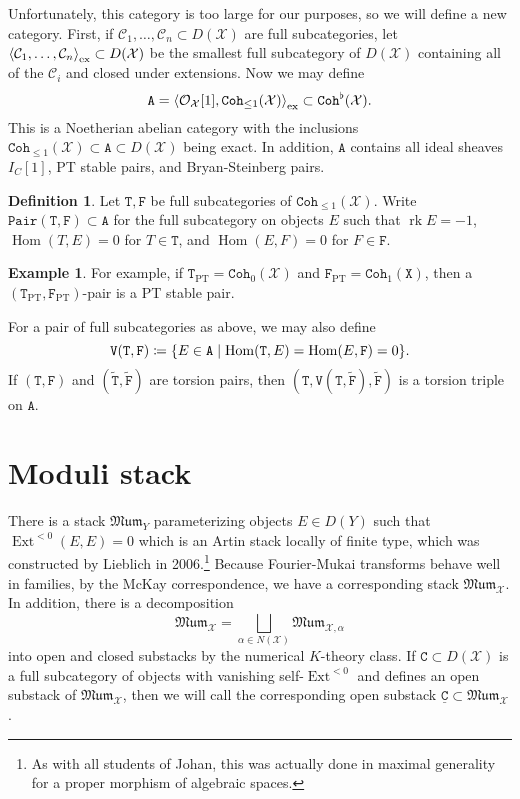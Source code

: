\documentclass{amsart}
\theoremstyle{definition}
\newtheorem{defn}[thm]{Definition}
\newtheorem{exm}[thm]{Example}
\theoremstyle{remark}
\theoremstyle{plain}
\theoremstyle{definition}
\theoremstyle{remark}
\newcommand{\mc}[1]{\mathcal{#1}}
\newcommand{\mf}[1]{\mathfrak{#1}}
\newcommand{\mr}[1]{\mathrm{#1}}
\newcommand{\on}[1]{\operatorname{#1}}
\newcommand{\mt}[1]{\mathtt{#1}}
\newcommand{\ul}[1]{\underline{#1}}
\newcommand{\wt}[1]{\widetilde{#1}}
\newcommand{\1}{\mathbf{1}}
\newcommand{\2}{\mathbf{2}}
\newcommand{\3}{\mathbf{3}}
\DeclareMathOperator{\Hom}{Hom}
\DeclareMathOperator{\Ext}{Ext}
\begin{document}
Unfortunately, this category is too large for our purposes, so we will define a new category. First, if $\mc{C}_1, \ldots, \mc{C}_n \subset D(\mc{X})$ are full subcategories, let $\ev{\mc{C}_1, \ldots, \mc{C}_n}_{\mr{ex}} \subset D(\mc{X})$ be the smallest full subcategory of $D(\mc{X})$ containing all of the $\mc{C}_i$ and closed under extensions. Now we may define 
\[ \mt{A} = \ev{\mc{O}_{\mc{X}}[1], \mt{Coh}_{\leq 1}(\mc{X})}_{\mr{ex}} \subset \mt{Coh}^{\flat}(\mc{X}). \]
This is a Noetherian abelian category with the inclusions $\mt{Coh}_{\leq 1}(\mc{X}) \subset \mt{A} \subset D(\mc{X})$ being exact. In addition, $\mt{A}$ contains all ideal sheaves $I_C[1]$, PT stable pairs, and Bryan-Steinberg pairs.

\begin{defn}
    Let $\mt{T}, \mt{F}$ be full subcategories of $\mt{Coh}_{\leq 1}(\mc{X})$. Write $\mt{Pair(T,F)} \subset \mt{A}$ for the full subcategory on objects $E$ such that $\on{rk} E = -1$, $\Hom(T, E) = 0$ for $T \in \mt{T}$, and $\Hom(E, F) = 0$ for $F \in \mt{F}$. 
\end{defn}

\begin{exm}
    For example, if $\mt{T}_{\mr{PT}} = \mt{Coh}_0(\mc{X})$ and $\mt{F}_{\mr{PT}} = \mt{Coh}_{1}(\mt{X})$, then a $(\mt{T}_{\mr{PT}}, \mt{F}_{\mr{PT}})$-pair is a PT stable pair.
\end{exm}

For a pair of full subcategories as above, we may also define
\[ \mt{V(T,F)} \coloneqq \qty{E \in \mt{A} \mid \Hom(\mt{T}, E) = \Hom(E, \mt{F}) = 0}. \]
If $(\mt{T}, \mt{F})$ and $(\wt{\mt{T}}, \wt{\mt{F}})$ are torsion pairs, then $(\mt{T}, \mt{V(T, \wt{F})}, \wt{\mt{F}})$ is a torsion triple on $\mt{A}$.

\section{Moduli stack}

There is a stack $\mf{Mum}_Y$ parameterizing objects $E \in D(Y)$ such that $\Ext^{<0}(E, E) = 0$ which is an Artin stack locally of finite type, which was constructed by Lieblich in 2006.\footnote{As with all students of Johan, this was actually done in maximal generality for a proper morphism of algebraic spaces.} Because Fourier-Mukai transforms behave well in families, by the McKay correspondence, we have a corresponding stack $\mf{Mum}_{\mc{X}}$. In addition, there is a decomposition
\[ \mf{Mum}_{\mc{X}} = \bigsqcup_{\alpha \in N(\mc{X})} \mf{Mum}_{\mc{X}, \alpha} \]
into open and closed substacks by the numerical $K$-theory class. If $\mt{C} \subset D(\mc{X})$ is a full subcategory of objects with vanishing self-$\Ext^{<0}$ and defines an open substack of $\mf{Mum}_{\mc{X}}$, then we will call the corresponding open substack $\mt{\ul{C}} \subset \mf{Mum}_{\mc{X}}$.
\end{document}
